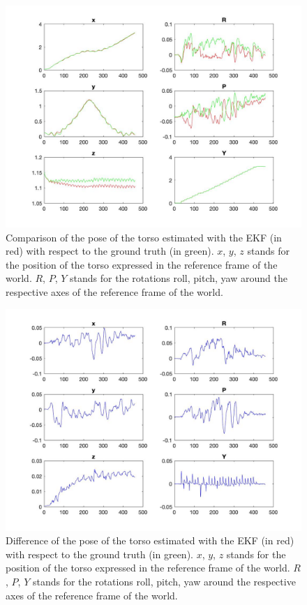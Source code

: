 \documentclass[a4paper]{article}
\begin{document}
\begin{figure}
    \centering
    \includegraphics[width=\textwidth]{images/comp_ground_truth_estimated_torso.jpg}
    \caption{Comparison of the pose of the torso estimated
        with the EKF (in red) with respect to the ground
        truth (in green). $x$, $y$, $z$ stands for the position
        of the torso expressed in the reference frame of the
        world. $R$, $P$, $Y$ stands for the rotations roll,
        pitch, yaw around the respective axes of the
        reference frame of the world.}
    \label{fig:comp-ground-truth-estimated-torso}
\end{figure}

\begin{figure}
    \centering
    \includegraphics[width=\textwidth]{images/diff_ground_truth_estimated_torso.jpg}
    \caption{Difference of the pose of the torso estimated
        with the EKF (in red) with respect to the ground
        truth (in green). $x$, $y$, $z$ stands for the position
        of the torso expressed in the reference frame of the
        world. $R$, $P$, $Y$ stands for the rotations roll,
        pitch, yaw around the respective axes of the
        reference frame of the world.}
    \label{fig:diff_ground_truth_estimated_torso}
\end{figure}
\end{document}

